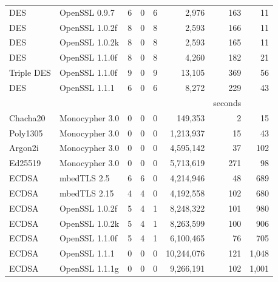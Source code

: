 \begin{table}
\begin{tabular}{llrrrrrr}
    DES                & OpenSSL 0.9.7            & 6                 & 0                 & 6              & 2,976       & 163     & 11    \\
    DES                & OpenSSL 1.0.2f           & 8                 & 0                 & 8              & 2,593       & 166     & 11    \\
    DES                & OpenSSL 1.0.2k           & 8                 & 0                 & 8              & 2,593       & 165     & 11    \\
    DES                & OpenSSL 1.1.0f           & 8                 & 0                 & 8              & 4,260       & 182     & 21    \\
    Triple DES         & OpenSSL 1.1.0f &  9 &0  &9   &13,105   & 369 & 56\\
    DES                & OpenSSL 1.1.1            & 6                 & 0                 & 6              & 8,272       & 229     & 43    \\
                       &                          &                   &                   &                &             & seconds         \\\cline{7-7}
    Chacha20           & Monocypher 3.0           & 0                 & 0                 & 0              & 149,353     & 2       & 15    \\
    Poly1305           & Monocypher 3.0           & 0                 & 0                 & 0              & 1,213,937   & 15      & 43    \\
    Argon2i            & Monocypher 3.0           & 0                 & 0                 & 0              & 4,595,142   & 37      & 102   \\
    Ed25519            & Monocypher 3.0           & 0                 & 0                 & 0              & 5,713,619   & 271     & 98    \\
    ECDSA              & mbedTLS 2.5              & 6                 & 6                 & 0              & 4,214,946   & 48      & 689   \\
    ECDSA              & mbedTLS 2.15             & 4                 & 4                 & 0              & 4,192,558   & 102     & 680   \\
    ECDSA              & OpenSSL 1.0.2f           & 5                 & 4                 & 1              & 8,248,322   & 101     & 980   \\
    ECDSA              & OpenSSL 1.0.2k           & 5                 & 4                 & 1              & 8,263,599   & 100     & 906   \\
    ECDSA              & OpenSSL 1.1.0f           & 5                 & 4                 & 1              & 6,100,465   & 76      & 705   \\
    ECDSA              & OpenSSL 1.1.1            & 0                 & 0                 & 0              & 10,244,076  & 121     & 1,048 \\
    ECDSA              & OpenSSL 1.1.1g           & 0                 & 0                 & 0              & 9,266,191   & 102     & 1,001 \\


\end{tabular}
\end{table}
